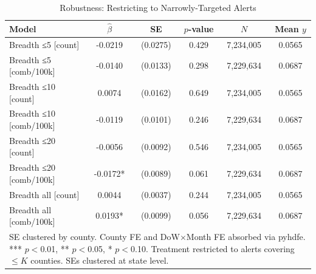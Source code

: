 \begin{table}[htbp]\centering
\caption{Robustness: Restricting to Narrowly-Targeted Alerts}
\begin{tabular}{lccccc}
\hline\hline
Model & $\hat\beta$ & SE & $p$-value & $N$ & Mean $y$ \\
\midrule
Breadth ≤5 [count] & -0.0219 & (0.0275) & 0.429 & 7,234,005 & 0.0565 \\
Breadth ≤5 [comb/100k] & -0.0140 & (0.0133) & 0.298 & 7,229,634 & 0.0687 \\
Breadth ≤10 [count] & 0.0074 & (0.0162) & 0.649 & 7,234,005 & 0.0565 \\
Breadth ≤10 [comb/100k] & -0.0119 & (0.0101) & 0.246 & 7,229,634 & 0.0687 \\
Breadth ≤20 [count] & -0.0056 & (0.0092) & 0.546 & 7,234,005 & 0.0565 \\
Breadth ≤20 [comb/100k] & -0.0172* & (0.0089) & 0.061 & 7,229,634 & 0.0687 \\
Breadth all [count] & 0.0044 & (0.0037) & 0.244 & 7,234,005 & 0.0565 \\
Breadth all [comb/100k] & 0.0193* & (0.0099) & 0.056 & 7,229,634 & 0.0687 \\
\hline\hline
\multicolumn{6}{p{0.9\textwidth}}{\footnotesize SE clustered by county. County FE and DoW$\times$Month FE absorbed via pyhdfe. *** $p{<}$0.01, ** $p{<}$0.05, * $p{<}$0.10. Treatment restricted to alerts covering $\leq K$ counties. SEs clustered at state level.} \\
\end{tabular}
\end{table}
